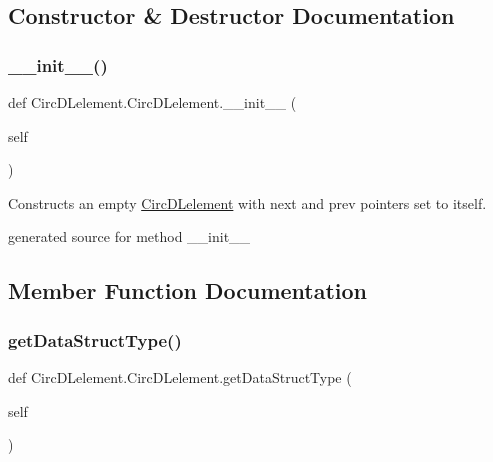\subsection{Constructor \& Destructor Documentation}
\hypertarget{class_circ_d_lelement_1_1_circ_d_lelement_a02986166d6a1a8ab414cbac1e90c26e4}{}\label{class_circ_d_lelement_1_1_circ_d_lelement_a02986166d6a1a8ab414cbac1e90c26e4} 
\subsubsection{\texorpdfstring{\+\_\+\+\_\+init\+\_\+\+\_\+()}{\_\_init\_\_()}}
{\footnotesize\ttfamily def Circ\+D\+Lelement.\+Circ\+D\+Lelement.\+\_\+\+\_\+init\+\_\+\+\_\+ (\begin{DoxyParamCaption}\item[{}]{self }\end{DoxyParamCaption})}



Constructs an empty \hyperlink{class_circ_d_lelement_1_1_circ_d_lelement}{Circ\+D\+Lelement} with next and prev pointers set to itself. 

\begin{DoxyVerb}generated source for method __init__ \end{DoxyVerb}
 

\subsection{Member Function Documentation}
\hypertarget{class_circ_d_lelement_1_1_circ_d_lelement_aa15b8fd836d6fb25b69f4be07b0e8247}{}\label{class_circ_d_lelement_1_1_circ_d_lelement_aa15b8fd836d6fb25b69f4be07b0e8247} 
\subsubsection{\texorpdfstring{get\+Data\+Struct\+Type()}{getDataStructType()}}
{\footnotesize\ttfamily def Circ\+D\+Lelement.\+Circ\+D\+Lelement.\+get\+Data\+Struct\+Type (\begin{DoxyParamCaption}\item[{}]{self }\end{DoxyParamCaption})}



